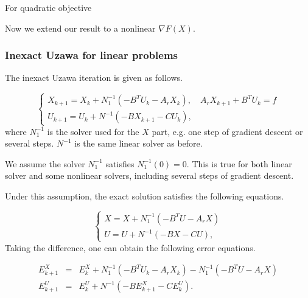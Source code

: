 \begin{theorem}
For quadratic objective 
\end{theorem}

Now we extend our result to a nonlinear $\nabla F(X)$. 

\subsubsection{Inexact Uzawa for linear problems}


The inexact Uzawa iteration is given as follows. 

\begin{equation}
    \begin{cases}
     X_{k+1} = X_k + N_1^{-1}(-B^T U_k - A_r X_k), \quad A_r X_{k+1} +B^T U_k = f \\
     U_{k+1} = U_k + N^{-1} \left( - B X_{k+1} - C U_k\right),
    \end{cases}
\end{equation}
where $N_1^{-1}$ is the solver used for the $X$ part, e.g. one step of gradient descent or several steps. $N^{-1}$ is the same linear solver as before. 

We assume the solver $N_1^{-1}$ satisfies  $N_1^{-1}(0) = 0$. This is true for both linear solver and some nonlinear solvers, including several steps of gradient descent.


Under this assumption, the exact solution satisfies the following equations. 

\begin{equation}
    \begin{cases}
     X = X + N_1^{-1}(-B^T U - A_r X)\\
     U = U + N^{-1} \left( - B X - C U\right),
    \end{cases}
\end{equation}
Taking the difference, one can obtain the following error equations. 

\begin{eqnarray}
 E^X_{k+1} & = & E^X_{k} + N_1^{-1} (-B^T U_k - A_r X_k) - N_1^{-1} (-B^T U - A_r X) \\
E_{k+1}^U &=& E_{k}^U + N^{-1} (- B E^X_{k+1} - C E^U_k).
\end{eqnarray}

